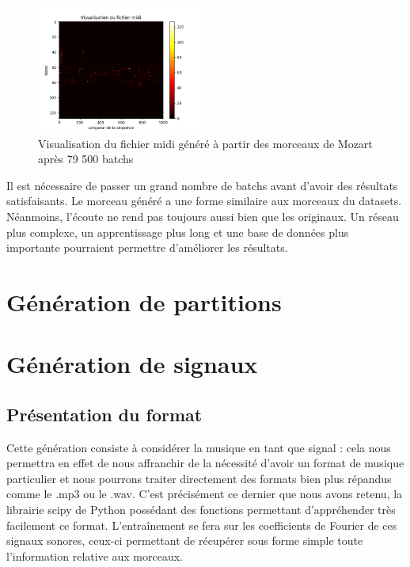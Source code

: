 \begin{figure}[!h]
  \centering
  \includegraphics[width=0.5\textwidth]{images/chapter9/midi_generated_mozart_79500.png}
  \caption{Visualisation du fichier midi généré à partir des morceaux de Mozart après 79 500 batchs}
  \label{midi_generated_mozart}
\end{figure}

Il est nécessaire de passer un grand nombre de batchs avant d'avoir des résultats satisfaisants. Le morceau généré a une forme similaire aux morceaux du datasets. Néanmoins, l'écoute ne rend pas toujours aussi bien que les originaux. Un réseau plus complexe, un apprentissage plus long et une base de données plus importante pourraient permettre d'améliorer les résultats.


\section{Génération de partitions}


\section{Génération de signaux}
\subsection{Présentation du format}
Cette génération consiste à considérer la musique en tant que signal : cela nous permettra en effet de nous affranchir de la nécessité d'avoir un format de musique particulier et nous pourrons traiter directement des formats bien plus répandus comme le .mp3 ou le .wav. C'est précisément ce dernier que nous avons retenu, la librairie scipy de Python possédant des fonctions permettant d'appréhender très facilement ce format. L'entraînement se fera sur les coefficients de Fourier de ces signaux sonores, ceux-ci permettant de récupérer sous forme simple toute l'information relative aux morceaux.

